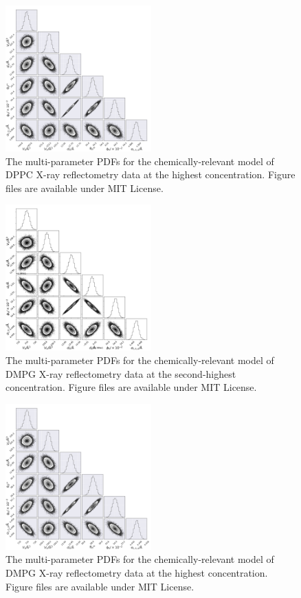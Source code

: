 \documentclass[11pt,a4paper]{article}
\begin{document}
\begin{figure}
	\centering
	\includegraphics[width=0.50\textwidth]{figures/dppc5_all_corner}
	\caption{The multi-parameter PDFs for the chemically-relevant model of DPPC X-ray reflectometry data at the highest concentration. Figure files are available under MIT License.\cite{mccluskey_2018}}
	\label{fig:dppc5}
\end{figure}
\begin{figure}
	\centering
	\includegraphics[width=0.50\textwidth]{figures/dmpg4_all_corner}
	\caption{The multi-parameter PDFs for the chemically-relevant model of DMPG X-ray reflectometry data at the second-highest concentration. Figure files are available under MIT License.\cite{mccluskey_2018}}
	\label{fig:dmpg4}
\end{figure}
\begin{figure}
	\centering
	\includegraphics[width=0.50\textwidth]{figures/dmpg5_all_corner}
	\caption{The multi-parameter PDFs for the chemically-relevant model of DMPG X-ray reflectometry data at the highest concentration. Figure files are available under MIT License.\cite{mccluskey_2018}}
	\label{fig:dmpg5}
\end{figure}
\end{document}
